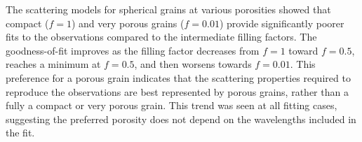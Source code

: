 

The scattering models for spherical grains at various porosities showed that compact ($f = 1$) and very porous grains ($f = 0.01$) provide significantly poorer fits to the observations compared to the intermediate filling factors. The goodness-of-fit improves as the filling factor decreases from $f = 1$ toward $f = 0.5$, reaches a minimum at $f = 0.5$, and then worsens towards $f = 0.01$. This preference for a porous grain indicates that the scattering properties required to reproduce the observations are best represented by porous grains, rather than a fully a compact or very porous grain. This trend was seen at all fitting cases, suggesting the preferred porosity does not depend on the wavelengths included in the fit. 





